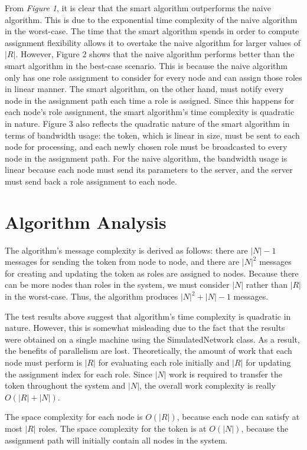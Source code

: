 \documentclass[11pt]{article}
\begin{document}
\begin{multicols}{2}
From \textit{Figure 1}, it is clear that the smart algorithm outperforms the naive algorithm. This is due to the exponential time complexity of the naive algorithm in the worst-case. The time that the smart algorithm spends in order to compute assignment flexibility allows it to overtake the naive algorithm for larger values of $|R|$. However, Figure 2 shows that the naive algorithm performs better than the smart algorithm in the best-case scenario. This is because the naive algorithm only has one role assignment to consider for every node and can assign those roles in linear manner. The smart algorithm, on the other hand, must notify every node in the assignment path each time a role is assigned. Since this happens for each node's role assignment, the smart algorithm's time complexity is quadratic in nature. Figure 3 also reflects the quadratic nature of the smart algorithm in terms of bandwidth usage: the token, which is linear in size, must be sent to each node for processing, and each newly chosen role must be broadcasted to every node in the assignment path. For the naive algorithm, the bandwidth usage is linear because each node must send its parameters to the server, and the server must send back a role assignment to each node.
\section{Algorithm Analysis}
The algorithm's message complexity is derived as follows: there are $|N| - 1$ messages for sending the token from node to node, and there are $|N|^2$  messages for creating and updating the token as roles are assigned to nodes. Because there can be more nodes than roles in the system, we must consider $|N|$ rather than $|R|$ in the worst-case. Thus, the algorithm produces $|N|^2 + |N| - 1$ messages.

The test results above suggest that algorithm's time complexity is quadratic in nature. However, this is somewhat misleading due to the fact that the results were obtained on a single machine using the SimulatedNetwork class. As a result, the benefits of parallelism are lost. Theoretically, the amount of work that each node must perform is $|R|$ for evaluating each role initially and $|R|$ for updating the assignment index for each role. Since $|N|$ work is required to transfer the token throughout the system and $|N|$, the overall work complexity is really $O(|R| + |N|)$.

The space complexity for each node is $O(|R|)$, because each node can satisfy at most $|R|$ roles. The space complexity for the token is at $O(|N|)$, because the assignment path will initially contain all nodes in the system.


\end{multicols}
\end{document}
